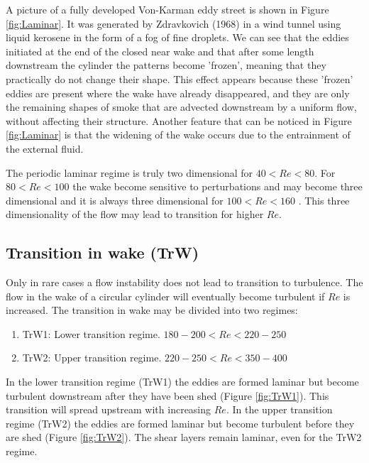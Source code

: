 \documentclass[journal]{new-aiaa}
\begin{document}
A picture of a fully developed Von-Karman eddy street is shown in Figure \ref{fig:Laminar}. It was generated by Zdravkovich (1968) \citep{Zdravkovich1968} in a wind tunnel using liquid kerosene in the form of a fog of fine droplets. We can see that the eddies initiated at the end of the closed near wake and that after some length downstream the cylinder the patterns become 'frozen', meaning that they practically do not change their shape. This effect appears because these 'frozen' eddies are present where the wake have already disappeared, and they are only the remaining shapes of smoke that are advected downstream by a uniform flow, without affecting their structure. Another feature that can be noticed in Figure \ref{fig:Laminar} is that the widening of the wake occurs due to the entrainment of the external fluid.

The periodic laminar regime is truly two dimensional for $40<Re<80$. For  $80<Re<100$ the wake become sensitive to perturbations and may become three dimensional and it is always three dimensional for  $100<Re<160$ \cite{Phillips1956}. This three dimensionality of the flow may lead to transition for higher $Re$.




\subsection{Transition in wake (TrW)}

Only in rare cases a flow instability does not lead to transition to turbulence. The flow in the wake of a circular cylinder will eventually become turbulent if $Re$ is increased. The transition in wake may be divided into two regimes:

\begin{enumerate}[label=(\roman*)]
\item TrW1: Lower transition regime. $180-200<Re<220-250$
\item TrW2: Upper transition regime. $220-250<Re<350-400$
\end{enumerate}

In the lower transition regime (TrW1) the eddies are formed laminar but become turbulent downstream after they have been shed (Figure \ref{fig:TrW1}). This transition will spread upstream with increasing $Re$. In the upper transition regime (TrW2) the eddies are formed laminar but become turbulent before they are shed (Figure \ref{fig:TrW2}). The shear layers remain laminar, even for the TrW2 regime.
\end{document}
